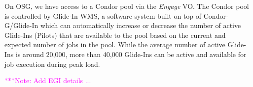 \documentclass[conference,final]{IEEEtran}
\newcommand{\jhanote}[1]{ {\textcolor{red} { ***shantenu: #1 }}}
\newcommand{\alnote}[1]{ {\textcolor{blue} { ***andreL: #1 }}}
\newcommand{\note}[1]{ {\textcolor{magenta} { ***Note: #1 }}}
\newcommand{\alnote}[1]{}
\newcommand{\jhanote}[1]{}
\newcommand{\note}[1]{}
\newcommand{\pilots}{Pilots\xspace}
\begin{document}
On OSG, we have access to a Condor pool via the \textit{Engage} VO.
The Condor pool is controlled by Glide-In WMS, a software system built
on top of Condor-G/Glide-In which can automatically increase or
decrease the number of active Glide-Ins (\pilots) that are available
to the pool based on the current and expected number of jobs in the
pool.  While the average number of active Glide-Ins is around 20,000,
more than 40,000 Glide-Ins can be active and available for job
execution during peak load.

\note{Add EGI details ...}
 


\end{document}
